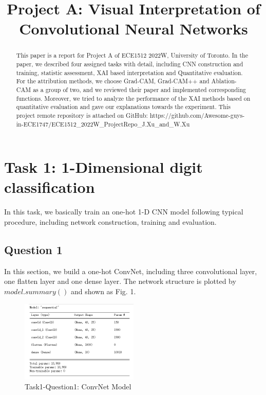 \documentclass[conference]{IEEEtran}
\begin{document}
\title{Project A: Visual Interpretation of Convolutional Neural Networks}
	\maketitle
	
	\begin{abstract}
		This paper is a report for Project A of ECE1512 2022W, University of Toronto. In the paper, we described four assigned tasks with detail, including CNN construction and training, statistic assessment, XAI based interpretation and Quantitative evaluation. For the attribution methods, we choose Grad-CAM, Grad-CAM++ and Ablation-CAM as a group of two, and we reviewed their paper and implemented corresponding functions. Moreover, we tried to analyze the performance of the XAI methods based on quantitative evaluation and gave our explanations towards the experiment. This project remote repository is attached on GitHub: https://github.com/Awesome-guys-in-ECE1747/ECE1512\_2022W\_ProjectRepo\_J.Xu\_and\_W.Xu
	\end{abstract}

	\section{Task 1: 1-Dimensional digit classification}
	
	In this task, we basically train an one-hot 1-D CNN model following typical procedure, including network construction, training and evaluation.
	
	\subsection{Question 1}
	
	In this section, we build a one-hot ConvNet, including three convolutional layer, one flatten layer and one dense layer.
	The network structure is plotted by $model.summary()$ and shown as Fig. 1.
	
	\begin{figure}[h] 
		\centering
		\includegraphics[width=0.5\textwidth]{T1Q1.png}
		\caption{Task1-Question1: ConvNet Model}
		\label{Fig.t1q1}
	\end{figure}
	
\end{document}
